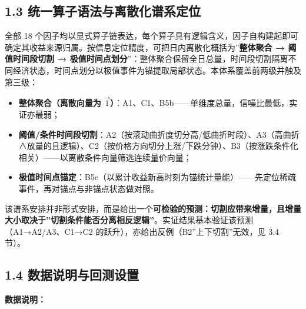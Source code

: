 \documentclass[UTF8,a4paper,zihao=-4,fontset=windows]{ctexart}
\providecommand{\tightlist}{\setlength{\itemsep}{0pt}\setlength{\parskip}{0pt}}
\begin{document}
\subsection{1.3
统一算子语法与离散化谱系定位}\label{ux7edfux4e00ux7b97ux5b50ux8bedux6cd5ux4e0eux79bbux6563ux5316ux8c31ux7cfbux5b9aux4f4d}

全部 18
个因子均以显式算子链表达，每个算子具有逻辑含义，因子自构建起即可确定其收益来源归属。按信息定位精度，可把日内离散化概括为''\textbf{整体聚合
→ 阈值时间段切割 →
极值时间点划分}''：整体聚合保留全日总量，时间段切割隔离不同经济状态，时间点划分以极值事件为锚提取局部状态。本体系覆盖前两级并触及第三级：

\begin{itemize}
\tightlist
\item
  \textbf{整体聚合（离散向量为
  \(\vec{1}\)）}：A1、C1、B5b------单维度总量，信噪比最低，实证亦最弱；
\item
  \textbf{阈值/条件时间段切割}：A2（按滚动曲折度切分高/低曲折时段）、A3（高曲折∧放量的且逻辑）、C2（按价格方向切分上涨/下跌分钟）、B3（按涨跌条件化相关）------以离散条件向量筛选连续量价向量；
\item
  \textbf{极值时间点锚定}：B5c（以累计收益新高时刻为锚统计量能）------先定位稀疏事件，再对锚点与非锚点状态做对照。
\end{itemize}

该谱系安排并非形式安排，而是给出一个\textbf{可检验的预测：切割应带来增量，且增量大小取决于''切割条件能否分离相反逻辑''}。实证结果基本验证该预测（A1→A2/A3、C1→C2
的跃升），亦给出反例（B2''上下切割''无效，见 3.4 节）。

\subsection{1.4
数据说明与回测设置}\label{ux6570ux636eux8bf4ux660eux4e0eux56deux6d4bux8bbeux7f6e}

\textbf{数据说明：}
\end{document}
